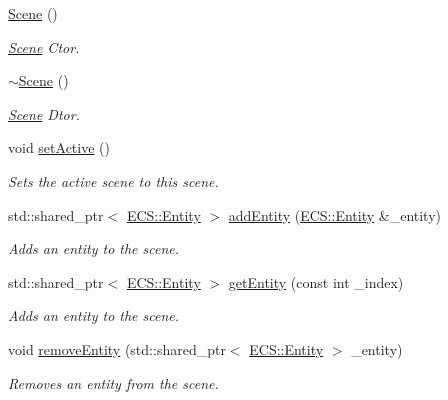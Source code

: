 \begin{DoxyCompactItemize}
\item 
\hyperlink{class_cookie_eng_1_1_scene_1_1_scene_a957b1da74150da2df341c1ff7ed39613}{Scene} ()
\begin{DoxyCompactList}\small\item\em \hyperlink{class_cookie_eng_1_1_scene_1_1_scene}{Scene} Ctor. \end{DoxyCompactList}\item 
\hyperlink{class_cookie_eng_1_1_scene_1_1_scene_a2aaed9f1b869d7c35b9d3fada5bf198a}{$\sim$\+Scene} ()
\begin{DoxyCompactList}\small\item\em \hyperlink{class_cookie_eng_1_1_scene_1_1_scene}{Scene} Dtor. \end{DoxyCompactList}\item 
void \hyperlink{class_cookie_eng_1_1_scene_1_1_scene_adca281b1bff287a62391b5bb8bc18f5c}{set\+Active} ()
\begin{DoxyCompactList}\small\item\em Sets the active scene to this scene. \end{DoxyCompactList}\item 
std\+::shared\+\_\+ptr$<$ \hyperlink{class_cookie_eng_1_1_e_c_s_1_1_entity}{E\+C\+S\+::\+Entity} $>$ \hyperlink{class_cookie_eng_1_1_scene_1_1_scene_a2cccad4cc0411852e327b249b12b9bc3}{add\+Entity} (\hyperlink{class_cookie_eng_1_1_e_c_s_1_1_entity}{E\+C\+S\+::\+Entity} \&\+\_\+entity)
\begin{DoxyCompactList}\small\item\em Adds an entity to the scene. \end{DoxyCompactList}\item 
std\+::shared\+\_\+ptr$<$ \hyperlink{class_cookie_eng_1_1_e_c_s_1_1_entity}{E\+C\+S\+::\+Entity} $>$ \hyperlink{class_cookie_eng_1_1_scene_1_1_scene_a4287243abfe6016c8c819aebc090bf4c}{get\+Entity} (const int \+\_\+index)
\begin{DoxyCompactList}\small\item\em Adds an entity to the scene. \end{DoxyCompactList}\item 
void \hyperlink{class_cookie_eng_1_1_scene_1_1_scene_aefa43f3ce579fe9798870c95d92711db}{remove\+Entity} (std\+::shared\+\_\+ptr$<$ \hyperlink{class_cookie_eng_1_1_e_c_s_1_1_entity}{E\+C\+S\+::\+Entity} $>$ \+\_\+entity)
\begin{DoxyCompactList}\small\item\em Removes an entity from the scene. \end{DoxyCompactList}\item 

\end{DoxyCompactItemize}
